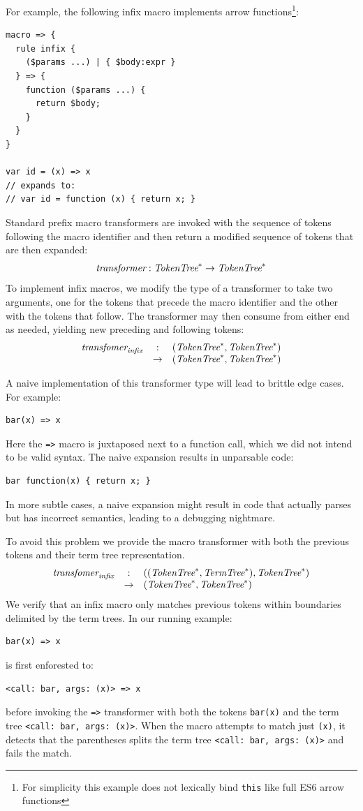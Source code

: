 \documentclass[preprint,10pt]{sigplanconf}
\begin{document}
For example, the following infix macro implements arrow
functions\footnote{For simplicity this example does not lexically bind
  \verb!this! like full ES6 arrow functions}:
\begin{lstlisting}
macro => {
  rule infix {
    ($params ...) | { $body:expr }
  } => {
    function ($params ...) {
      return $body; 
    }
  }
}

var id = (x) => x
// expands to:
// var id = function (x) { return x; }
\end{lstlisting}


Standard prefix macro transformers are invoked with the sequence of
tokens following the macro identifier and then return a modified
sequence of tokens that are then expanded:
\[
\textit{transformer} : \textit{TokenTree}^* \rightarrow \textit{TokenTree}^*
\]
To implement infix macros, we modify the type of a transformer to
take two arguments, one for the tokens that precede the macro
identifier and the other with the tokens that follow. The transformer
may then consume from either end as needed, yielding new preceding
and following tokens:
\[
\begin{array}{rcl}
  \textit{transfomer}_{\textit{infix}} &:& (\textit{TokenTree}^*, \textit{TokenTree}^*) 
  \\
  &\rightarrow& (\textit{TokenTree}^*, \textit{TokenTree}^*)
\end{array}
\]

A naive implementation of this transformer type will lead to brittle
edge cases. For example:
\begin{lstlisting}
bar(x) => x
\end{lstlisting}
Here the \verb!=>! macro is juxtaposed next to a function call,
which we did not intend to be valid syntax. The naive expansion results
in unparsable code:
\begin{lstlisting}
bar function(x) { return x; }
\end{lstlisting}

In more subtle cases, a naive expansion might result in code that
actually parses but has incorrect semantics, leading to a
debugging nightmare.

To avoid this problem we provide the macro transformer with both the
previous tokens and their term tree representation.
\[
\begin{array}{rcl}
  \textit{transfomer}_{\textit{infix}} &:& ((\textit{TokenTree}^*, \textit{TermTree}^{*}), \textit{TokenTree}^*) 
  \\
  &\rightarrow& (\textit{TokenTree}^*, \textit{TokenTree}^*)
\end{array}
\]
We verify that an infix macro only
matches previous tokens within boundaries delimited by 
the term trees. In our running example:
\begin{lstlisting}
bar(x) => x
\end{lstlisting}
is first enforested to:
\begin{lstlisting}
<call: bar, args: (x)> => x
\end{lstlisting}
before invoking the \verb!=>! transformer with both the tokens
\verb!bar(x)! and the term tree
\verb!<call: bar, args: (x)>!. When the macro attempts to match
just \verb!(x)!, it detects that the parentheses splits the term
tree \verb!<call: bar, args: (x)>! and fails the match.
\end{document}

